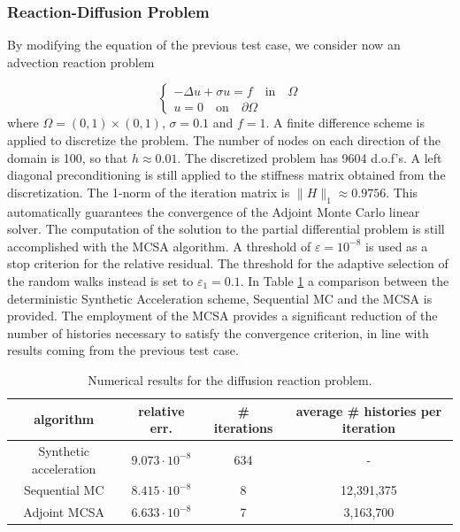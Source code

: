 \subsubsection{Reaction-Diffusion Problem}

By modifying the equation of the previous test case, we consider now
an advection reaction problem

\begin{equation}
\begin{cases}
 -\Delta u +\sigma u= f \quad \text{in}\quad \Omega \\
 u=0\quad \text{on} \quad \partial\Omega
 \end{cases}
\end{equation}
where $\Omega=(0,1)\times (0,1)$, $\sigma=0.1$ and $f=1$.
A finite difference scheme is applied to discretize the problem.
The number of nodes
on each direction of the domain is 100, so that $h\approx 0.01$. The
discretized problem has 9604 d.o.f's. A left
diagonal preconditioning is still applied to
the stiffness matrix obtained from the discretization. The 1-norm of the
iteration matrix is $\lVert H\rVert_1\approx 0.9756$. This automatically
guarantees the convergence of the Adjoint Monte Carlo linear solver. The
computation of the solution to the partial differential problem is still
accomplished with the MCSA algorithm. A threshold of $\varepsilon =10^{-8}$ is
used as a stop criterion for the relative residual. The threshold
for the adaptive selection of the random walks instead is set
to $\varepsilon_1=0.1$.
In Table \ref{DR_results} a comparison between the deterministic Synthetic
Acceleration
scheme, Sequential MC and the MCSA is provided.
The employment of the MCSA provides a significant reduction of the number of
histories necessary to satisfy the convergence criterion, in line with results
coming from the previous test case.

\begin{table}[!h]
\centering
\hspace*{-0.8cm}
\begin{tabular}{|c|c|c|c|}
\hline
algorithm & relative err.& \# iterations & average \# histories per iteration\\
\hline
 Synthetic acceleration & $9.073\cdot 10^{-8}$ & 634 & - \\
\hline
 Sequential MC & $8.415 \cdot 10^{-8}$ &  8 & 12,391,375\\
 \hline
 Adjoint MCSA & $6.633 \cdot 10^{-8}$ &  7 & 3,163,700\\
\hline
\end{tabular}
\caption{Numerical results for the diffusion reaction problem.}
\label{DR_results}
\end{table}


